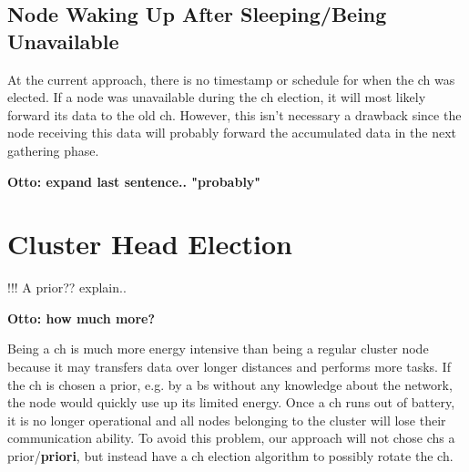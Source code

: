 \documentclass[USenglish]{uit-thesis}
\begin{document}
\subsection{Node Waking Up After Sleeping/Being Unavailable}




At the current approach, there is no timestamp or schedule for when the \gls{ch} was elected. If a node was unavailable during the \gls{ch} election, it will most likely forward its data to the old \gls{ch}. However, this isn't necessary a drawback since the node receiving this data will probably forward the accumulated data in the next gathering phase.

\textbf{Otto: expand last sentence.. "probably"}


\section{Cluster Head Election}
!!! A prior?? explain..

\textbf{Otto: how much more?}

Being a \gls{ch} is much more energy intensive than being a regular cluster node because it may transfers data over longer distances and performs more tasks. If the \gls{ch} is chosen a prior, e.g. by a \gls{bs} without any knowledge about the network, the node would quickly use up its limited energy. Once a \gls{ch} runs out of battery, it is no longer operational and all nodes belonging to the cluster will lose their communication ability. To avoid this problem, our approach will not chose \gls{ch}s a prior/\textbf{priori}, but instead have a \gls{ch} election algorithm to possibly rotate the \gls{ch}.
\end{document}
